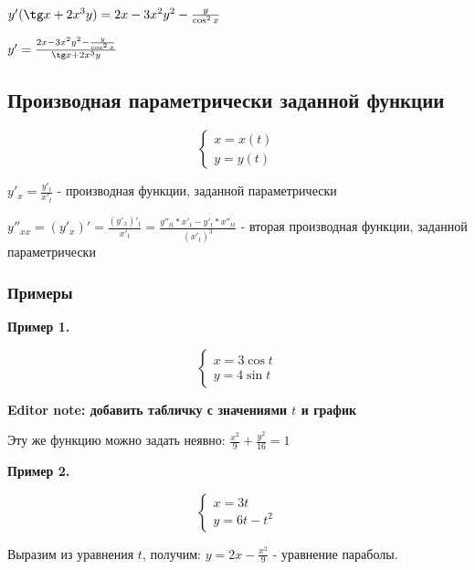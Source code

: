 \documentclass{article}
\begin{document}
\begin{flushleft}
{$y'(\tg x + 2x^3y) = 2x - 3 x^2 y^2 - \frac{y}{\cos^2 x}$

$y' = \frac{2x - 3 x^2 y^2 - \frac{y}{\cos^2 x}}{\tg x + 2 x^3 y}$
}

\pagebreak
\subsection{Производная параметрически заданной функции}

\begin{equation}
    \begin{cases}
        x = x(t) \\
        y = y(t)
    \end{cases}
\end{equation}

$y'_x = \frac{y'_t}{x'_t}$ - производная функции, заданной параметрически

$y''_{xx} = (y'_x)' = \frac{(y'_x)'_t}{x'_t} = \frac{y''_{t t} * x'_t - y'_t * x''_{t t}}{(x'_t)^3}$ - вторая производная функции, заданной параметрически

\subsubsection{Примеры}

\textbf{Пример 1.}

\begin{equation}
    \begin{cases}
        x = 3 \cos t \\
        y = 4 \sin t
    \end{cases}
\end{equation}

\textbf{Editor note: добавить табличку с значениями $t$ и график}

\hfill

Эту же функцию можно задать неявно: $\frac{x^2}{9} + \frac{y^2}{16} = 1$

\hfill

\textbf{Пример 2.}

\begin{equation}
    \begin{cases}
        x = 3t \\
        y = 6t - t^2
    \end{cases}
\end{equation}

Выразим из уравнения $t$, получим: $y = 2x - \frac{x^2}{9}$ - уравнение параболы.


\end{flushleft}
\end{document}

